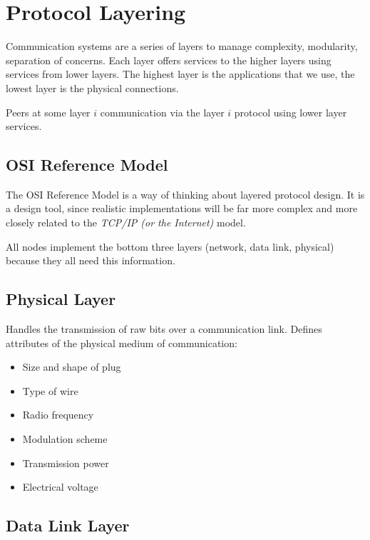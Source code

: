 \section{Protocol Layering}\label{sec:protocol_layering}

Communication systems are a series of layers to manage complexity, modularity, separation of concerns.
Each layer offers services to the higher layers using services from lower  layers.
The highest layer is the applications that we use, the lowest layer is the physical connections.

Peers at some layer \(i\) communication via the layer \(i\) protocol using lower layer services.

\subsection{OSI Reference Model}\label{sub:osi_reference_model}

The OSI Reference Model is a way of thinking about layered protocol design.
It is a design tool, since realistic implementations will be far more complex and more closely related to the \emph{TCP/IP (or the Internet)} model.

\begin{note}
	All nodes implement the bottom three layers (network, data link, physical) because they all need this information.
\end{note}
\subsection{Physical Layer}\label{sub:physical_layer}

Handles the transmission of raw bits over a communication link.
Defines attributes of the physical medium of communication:
\begin{itemize}
	\item Size and shape of plug
	\item Type of wire
	\item Radio frequency
	\item Modulation scheme
	\item Transmission power
	\item Electrical voltage
\end{itemize}

\subsection{Data Link Layer}\label{sub:data_link_layer}

